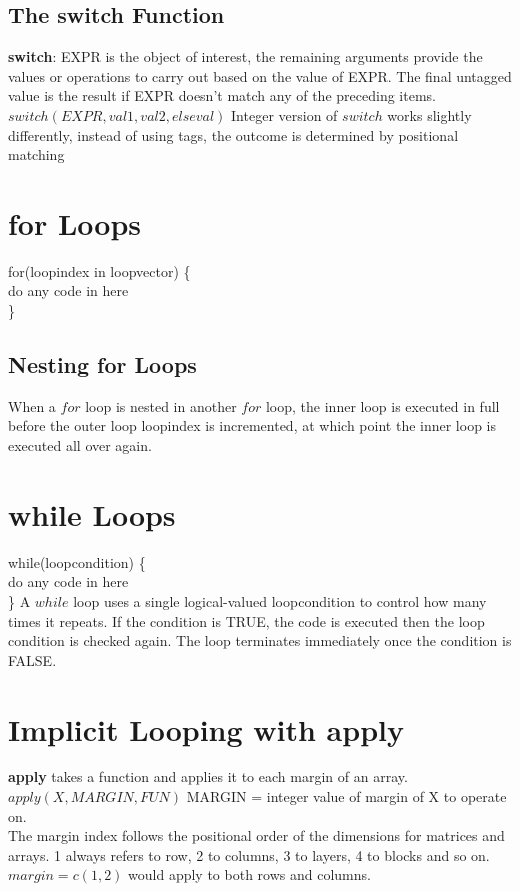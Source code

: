 \documentclass[openany]{book}
\begin{document}
\begin{flushleft}
\subsection{The switch Function}
\textbf{switch}: EXPR is the object of interest, the remaining arguments provide the values or operations to carry out based on the value of EXPR. The final untagged value is the result if EXPR doesn't match any of the preceding items. \medbreak
$switch(EXPR,val1,val2,else val)$ \medbreak
Integer version of $switch$ works slightly differently, instead of using tags, the outcome is determined by positional matching
\section{for Loops}
for(loopindex in loopvector) \{\\
\qquad do any code in here\\
\}
\subsection{Nesting for Loops}
When a $for$ loop is nested in another $for$ loop, the inner loop is executed in full before the outer loop loopindex is incremented, at which point the inner loop is executed all over again.

\section{while Loops}
while(loopcondition) \{ \\
\qquad do any code in here\\
\} \medbreak
A $while$ loop uses a single logical-valued loopcondition to control how many times it repeats. If the condition is TRUE, the code is executed then the loop condition is checked again. The loop terminates immediately once the condition is FALSE. \medbreak
\section{Implicit Looping with apply}
\textbf{apply} takes a function and applies it to each margin of an array. \medbreak
$apply(X,MARGIN,FUN)$ \medbreak
MARGIN = integer value of margin of X to operate on. \\
The margin index follows the positional order of the dimensions for matrices and arrays. 1 always refers to row, 2 to columns, 3 to layers, 4 to blocks and so on. $margin=c(1,2)$ would apply to both rows and columns.

\end{flushleft}
\end{document}
